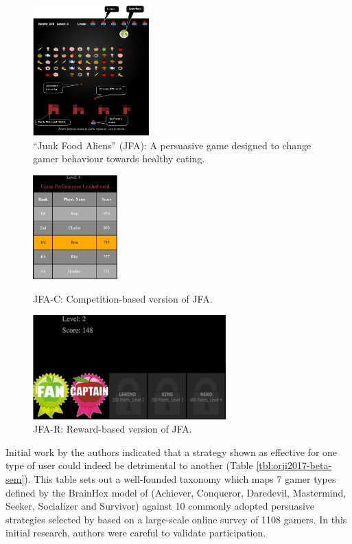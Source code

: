 \documentclass[11pt]{article}
\begin{document}
\begin{figure}[H]
\centering
\includegraphics[width=0.4\textwidth]{img/orji2017-junk-food-aliens.png} 
\caption{``Junk Food Aliens'' (JFA): A persuasive game designed to change gamer behaviour towards healthy eating.}\label{fig:orji2017-junk-food-aliens}
\end{figure}

\begin{figure}[H]
\centering
  \includegraphics[height=4cm]{img/orji2017-junk-food-aliens-competition.png}
  \caption{JFA-C: Competition-based version of JFA.}\label{fig:orji2017-junk-food-aliens-competition}
\endminipage\hfill
{}%
\centering
  \includegraphics[height=4cm]{img/orji2017-junk-food-aliens-reward.png}
  \caption{JFA-R: Reward-based version of JFA.}\label{fig:orji2017-junk-food-aliens-reward}
\endminipage
\end{figure}

Initial work by the authors indicated that a strategy shown as effective for one type of user could indeed be detrimental to another \citep{orji2013a} (Table \ref{tbl:orji2017-beta-sem}). This table sets out a well-founded taxonomy which maps 7 gamer types defined by the BrainHex model of \citet{nacke2014} (Achiever, Conqueror, Daredevil, Mastermind, Seeker, Socializer and Survivor) against 10 commonly adopted persuasive strategies selected by \citet{gerling2014} based on a large-scale online survey of 1108 gamers.  In this initial research, authors were careful to validate participation. 
\end{document}
